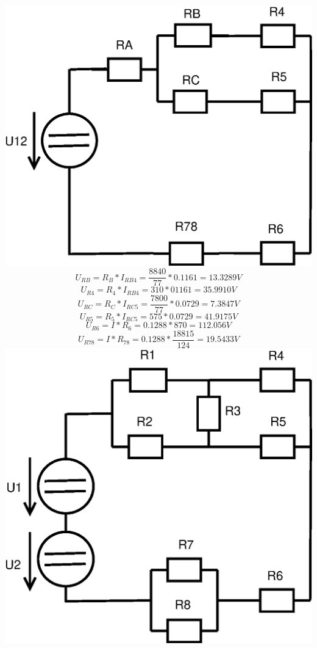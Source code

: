 \documentclass[a4paper, 12pt]{article}
\begin{document}
\newpage
\includegraphics[scale=0.4]{pr1/Diagram2.eps}
\vspace{1mm}
$$ U_{RB} = R_B * I_{RB4} = \frac{8840}{77} * 0.1161 = 13.3289 V $$
\vspace{1mm}
$$ U_{R4} = R_4 * I_{RB4} = 310 * 01161 = 35.9910 V $$
\vspace{1mm}
$$ U_{RC} = R_C * I_{RC5} = \frac{7800}{77} * 0.0729 = 7.3847 V$$
\vspace{1mm}
$$ U_{R5} = R_5 * I_{RC5} =  575 * 0.0729 = 41.9175 V$$
\vspace{1mm}
$$ U_{R6} = I * R_6 = 0.1288 * 870 = 112.056 V $$
\vspace{1mm}
$$ U_{R78} = I * R_{78} = 0.1288 * \frac{18815}{124} = 19.5433 V $$
\vspace{1mm}
\includegraphics[scale=0.4]{pr1/Diagram1.eps}
\end{document}
